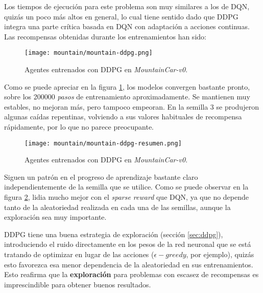 \documentclass[11pt,fleqn]{book} %
\begin{document}
Los tiempos de ejecución para este problema son muy similares a los de DQN, quizás un poco más altos en general, lo cual tiene sentido dado que DDPG integra una parte crítica basada en DQN con adaptación a acciones continuas. Las recompensas obtenidas durante los entrenamientos han sido:

\begin{figure}[H]
	\centering\texttt{[image: mountain/mountain-ddpg.png]}
	\caption{Agentes entrenados con DDPG en \textit{MountainCar-v0}.}
	\label{fig:mountainDDPG} %
\end{figure} 

Como se puede apreciar en la figura \ref{fig:mountainDDPG}, los modelos convergen bastante pronto, sobre los 200000 \textit{pasos} de entrenamiento aproximadamente. Se mantienen muy estables, no mejoran más, pero tampoco empeoran. En la semilla 3 se produjeron algunas caídas repentinas, volviendo a sus valores habituales de recompensa rápidamente, por lo que no parece preocupante.

\begin{figure}[H]
	\centering\texttt{[image: mountain/mountain-ddpg-resumen.png]}
	\caption{Agentes entrenados con DDPG en \textit{MountainCar-v0}.}
	\label{fig:mountainDDPGresumen} %
\end{figure}

Siguen un patrón en el progreso de aprendizaje bastante claro independientemente de la semilla que se utilice. Como se puede observar en la figura \ref{fig:mountainDDPGresumen}, lidia mucho mejor con el \textit{sparse reward} que DQN, ya que no depende tanto de la aleatoriedad realizada en cada una de las semillas, aunque la exploración sea muy importante. 

DDPG tiene una buena estrategia de exploración (sección \ref{sec:ddpg}), introduciendo el ruido directamente en los pesos de la red neuronal que se está tratando de optimizar en lugar de las acciones ($\epsilon-greedy$, por ejemplo), quizás esto favorezca esa menor dependencia de la aleatoriedad en sus entrenamientos. Esto reafirma que la \textbf{exploración} para problemas con escasez de recompensas es imprescindible para obtener buenos resultados. 
\end{document}
